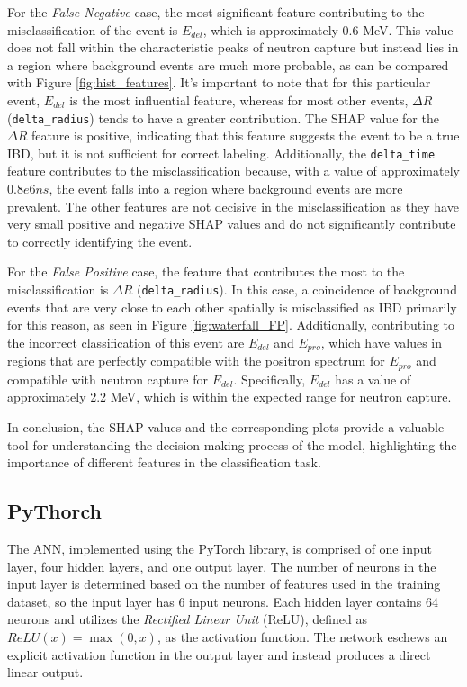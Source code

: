 For the \textit{False Negative} case, the most significant feature contributing to the misclassification of the event is $E_{del}$, which is approximately 0.6 MeV. This value does not fall within the characteristic peaks of neutron capture but instead lies in a region where background events are much more probable, as can be compared with Figure \ref{fig:hist_features}. It's important to note that for this particular event, $E_{del}$ is the most influential feature, whereas for most other events, $\Delta R$ (\texttt{delta\_radius}) tends to have a greater contribution. The SHAP value for the $\Delta R$ feature is positive, indicating that this feature suggests the event to be a true IBD, but it is not sufficient for correct labeling. Additionally, the \texttt{delta\_time} feature contributes to the misclassification because, with a value of approximately $0.8e6 ns$, the event falls into a region where background events are more prevalent. The other features are not decisive in the misclassification as they have very small positive and negative SHAP values and do not significantly contribute to correctly identifying the event.

For the \textit{False Positive} case, the feature that contributes the most to the misclassification is $\Delta R$ (\texttt{delta\_radius}). In this case, a coincidence of background events that are very close to each other spatially is misclassified as IBD primarily for this reason, as seen in Figure \ref{fig:waterfall_FP}. Additionally, contributing to the incorrect classification of this event are $E_{del}$ and $E_{pro}$, which have values in regions that are perfectly compatible with the positron spectrum for $E_{pro}$ and compatible with neutron capture for $E_{del}$. Specifically, $E_{del}$ has a value of approximately 2.2 MeV, which is within the expected range for neutron capture.


In conclusion, the SHAP values and the corresponding plots provide a valuable tool for understanding the decision-making process of the model, highlighting the importance of different features in the classification task. 


\subsection{PyThorch}
The ANN, implemented using the PyTorch library, is comprised of one input layer, four hidden layers, and one output layer. The number of neurons in the input layer is determined based on the number of features used in the training dataset, so the input layer has 6 input neurons. Each hidden layer contains 64 neurons and utilizes the \textit{Rectified Linear Unit} (ReLU), defined as $ ReLU(x) = \max(0, x) $, as the activation function. The network eschews an explicit activation function in the output layer and instead produces a direct linear output.

